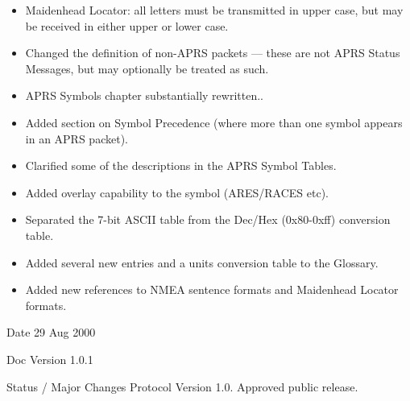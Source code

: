 \begin{itemize}
\begin{itemize}
\end{itemize}
\item   Maidenhead Locator: all letters must be transmitted in upper case, but may be received in
either upper or lower case.
\item Changed the definition of non-APRS packets — these are not APRS Status Messages, but
may optionally be treated as such.
\item APRS Symbols chapter substantially rewritten..
\item Added section on Symbol Precedence (where more than one symbol appears in an APRS
packet).
\item Clarified some of the descriptions in the APRS Symbol Tables.
\item Added overlay capability to the \a symbol (ARES/RACES etc).
\item Separated the 7-bit ASCII table from the Dec/Hex (0x80-0xff) conversion table.
\item Added several new entries and a units conversion table to the Glossary.
\item Added new references to NMEA sentence formats and Maidenhead Locator formats.
\end{itemize}

Date
29 Aug 2000

Doc
Version
1.0.1

Status / Major Changes
Protocol Version 1.0. Approved public release.


